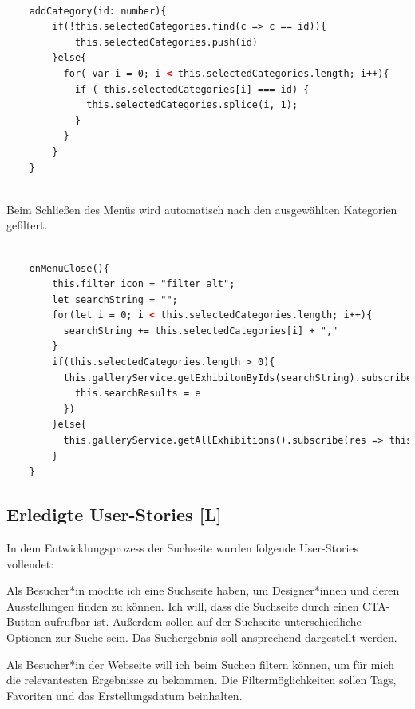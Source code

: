 \begin{lstlisting}[caption={Auswählen und Abwählen der Kategorien},language=HTML]

    addCategory(id: number){
        if(!this.selectedCategories.find(c => c == id)){
            this.selectedCategories.push(id)
        }else{
          for( var i = 0; i < this.selectedCategories.length; i++){
            if ( this.selectedCategories[i] === id) {
              this.selectedCategories.splice(i, 1);
            }
          }
        }
    }
        
\end{lstlisting}

Beim Schließen des Menüs wird automatisch nach den ausgewählten Kategorien gefiltert.


\begin{lstlisting}[caption={Filter von Kategorien anwenden},language=HTML]

    onMenuClose(){
        this.filter_icon = "filter_alt";
        let searchString = "";
        for(let i = 0; i < this.selectedCategories.length; i++){
          searchString += this.selectedCategories[i] + ","
        }
        if(this.selectedCategories.length > 0){
          this.galleryService.getExhibitonByIds(searchString).subscribe(e => {
            this.searchResults = e
          })
        }else{
          this.galleryService.getAllExhibitions().subscribe(res => this.searchResults = res);
        }
    }
\end{lstlisting}



\subsection{Erledigte User-Stories [L]}
In dem Entwicklungsprozess der Suchseite wurden folgende User-Stories vollendet:
\begin{compactitem}
  \item Als Besucher*in möchte ich eine Suchseite haben, um Designer*innen und deren Ausstellungen finden zu können. Ich will, dass die Suchseite durch einen CTA-Button aufrufbar ist. Außerdem sollen auf der Suchseite unterschiedliche Optionen zur Suche sein. Das Suchergebnis soll ansprechend dargestellt werden.
  \item Als Besucher*in der Webseite will ich beim Suchen filtern können, um für mich die relevantesten Ergebnisse zu bekommen. Die Filtermöglichkeiten sollen Tags, Favoriten und das Erstellungsdatum beinhalten.
\end{compactitem}